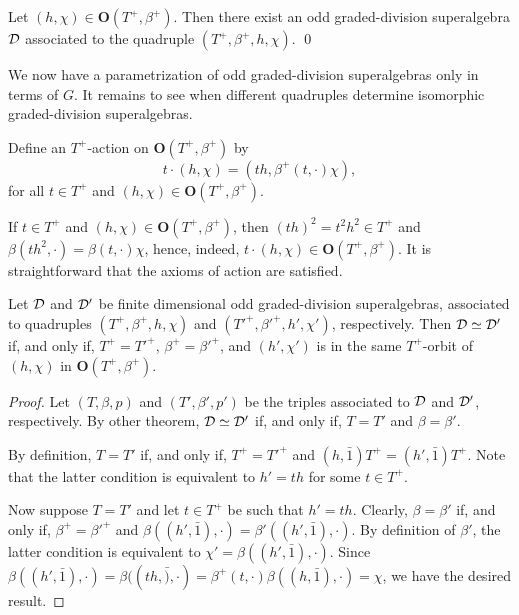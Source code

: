 \begin{prop}\label{prop:D-defined-by-quadruple}
    Let $(h, \chi) \in \mathbf{O}(T^+, \beta^+)$. 
    Then there exist an odd graded-division superalgebra $\mathcal{D}$ associated to the quadruple $(T^+, \beta^+, h,\chi)$. \qed
\end{prop}

We now have a parametrization of odd graded-division superalgebras only in terms of $G$. 
It remains to see when different quadruples determine isomorphic graded-division superalgebras. 

\begin{defi}\label{def:T^+-action}
    Define an $T^+$-action on $\mathbf{O} (T^+, \beta^+)$ by
    \[
        t \cdot (h, \chi) = (th, \beta^+(t, \cdot) \chi),
    \]
    for all $t\in T^+$ and $(h, \chi) \in \mathbf{O} (T^+, \beta^+)$.
\end{defi}

If $t\in T^+$ and $(h, \chi) \in \mathbf {O} (T^+, \beta^+)$, then $(th)^2 = t^2h^2\in T^+$ and $\beta(th^2, \cdot) = \beta(t, \cdot) \chi$, hence, indeed, $t \cdot (h, \chi) \in \mathbf {O} (T^+, \beta^+)$. 
It is straightforward that the axioms of action are satisfied. 

\begin{thm}\label{thm:iso-odd-D-only-G}
    Let $\mathcal{D}$ and $\mathcal{D}'$ be finite dimensional odd graded-division superalgebras, associated to quadruples $(T^+, \beta^+, h, \chi)$ and $(T'^+, \beta'^+, h', \chi')$, respectively. 
    Then $\mathcal{D} \simeq \mathcal{D}'$ if, and only if, $T^+ = T'^+$, $\beta^+ = \beta'^+$, and $(h', \chi')$ is in the same $T^+$-orbit of $(h, \chi)$ in $\mathbf {O} (T^+, \beta^+)$. 
\end{thm}

\begin{proof}
    Let $(T, \beta, p)$ and $(T', \beta', p')$ be the triples associated to $\mathcal{D}$ and $\mathcal{D}'$, respectively. 
    By other theorem, $\mathcal{D} \simeq \mathcal{D}'$ if, and only if, $T= T'$ and $\beta = \beta'$. 
    
    By definition, $T= T'$ if, and only if, $T^+ = T'^+$ and $(h, \bar 1)T^+ = (h', \bar 1)T^+$. 
    Note that the latter condition is equivalent to 
    $h' = th$ for some $t\in T^+$. 
    
    Now suppose $T= T'$ and let $t\in T^+$ be such that $h' = th$. 
    Clearly, $\beta = \beta'$ if, and only if, 
    $\beta^+ = \beta'^+$ and $\beta((h', \bar 1), \cdot) = \beta'((h', \bar 1), \cdot)$. 
    By definition of $\beta'$, the latter condition is equivalent to $\chi' = \beta((h', \bar 1), \cdot)$. 
    Since $\beta((h', \bar 1), \cdot) = \beta ((th, \bar), \cdot) = \beta^+ (t, \cdot) \beta ((h, \bar 1), \cdot) = \chi$, we have the desired result. 
\end{proof}

